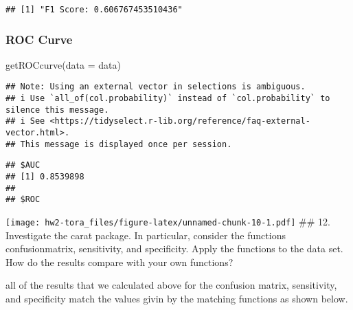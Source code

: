 \documentclass[
]{article}
\newenvironment{Shaded}{\begin{snugshade}}{\end{snugshade}}
\newcommand{\AttributeTok}[1]{\textcolor[rgb]{0.77,0.63,0.00}{#1}}
\newcommand{\FunctionTok}[1]{\textcolor[rgb]{0.00,0.00,0.00}{#1}}
\newcommand{\NormalTok}[1]{#1}
\newcommand{\OtherTok}[1]{\textcolor[rgb]{0.56,0.35,0.01}{#1}}
\newcommand{\SpecialCharTok}[1]{\textcolor[rgb]{0.00,0.00,0.00}{#1}}
\begin{document}
\begin{verbatim}
## [1] "F1 Score: 0.606767453510436"
\end{verbatim}

\hypertarget{roc-curve}{%
\subsubsection{ROC Curve}\label{roc-curve}}

\begin{Shaded}
\begin{Highlighting}[]
\FunctionTok{getROCcurve}\NormalTok{(}\AttributeTok{data =}\NormalTok{ data)}
\end{Highlighting}
\end{Shaded}

\begin{verbatim}
## Note: Using an external vector in selections is ambiguous.
## i Use `all_of(col.probability)` instead of `col.probability` to silence this message.
## i See <https://tidyselect.r-lib.org/reference/faq-external-vector.html>.
## This message is displayed once per session.
\end{verbatim}

\begin{verbatim}
## $AUC
## [1] 0.8539898
## 
## $ROC
\end{verbatim}

\texttt{[image: hw2-tora\_files/figure-latex/unnamed-chunk-10-1.pdf]}
\#\# 12. Investigate the carat package. In particular, consider the
functions confusionmatrix, sensitivity, and specificity. Apply the
functions to the data set. How do the results compare with your own
functions?

all of the results that we calculated above for the confusion matrix,
sensitivity, and specificity match the values givin by the matching
functions as shown below.

\begin{Shaded}
\end{Shaded}
\end{document}
